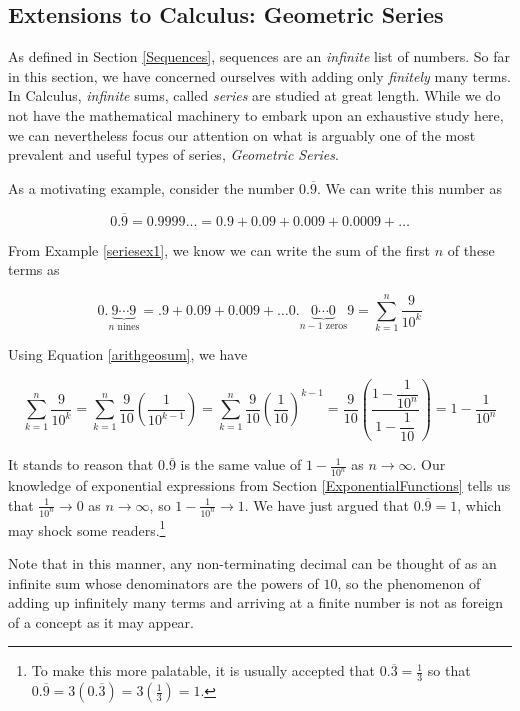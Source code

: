 \subsection{Extensions to Calculus: Geometric Series}

As defined in Section \ref{Sequences}, sequences are an \textit{infinite} list of numbers.  So far in this section, we have concerned ourselves with adding only \textit{finitely} many terms.   In Calculus,  \textit{infinite} sums, called \textit{series} are studied at great length.  While we do not have the mathematical machinery to embark upon an exhaustive study here, we can nevertheless focus our attention on what is arguably one of the most prevalent and useful types of series, \textit{Geometric Series}.

As a motivating example, consider the number $0.\overline{9}$.  We can write this number as

\[ 0.\overline{9} = 0.9999... = 0.9 + 0.09 + 0.009 + 0.0009 + \ldots \]


From Example \ref{seriesex1}, we know we can write the sum of the first $n$ of these terms as 

\[ 0.\underbrace{9 \cdots 9}_{\text{$n$ nines}} = .9 + 0.09 + 0.009 + \ldots 0.\! \! \! \! \underbrace{0 \cdots 0}_{\text{$n-1$ zeros}} \! \! \! \! 9 = \displaystyle{\sum_{k=1}^{n} \dfrac{9}{10^{k}}} \]

Using Equation \ref{arithgeosum}, we have


\[\displaystyle{\sum_{k=1}^{n} \dfrac{9}{10^{k}}} = \sum_{k=1}^{n} \dfrac{9}{10} \left(\dfrac{1}{10^{k-1}}\right) = \sum_{k=1}^{n} \dfrac{9}{10} \left(\dfrac{1}{10}\right)^{k-1} =  \dfrac{9}{10} \left( \dfrac{1 - \dfrac{1}{10^{n}}}{1 - \dfrac{1}{10}} \right) = 1 - \dfrac{1}{10^{n}}   \]

It stands to reason that $0.\overline{9}$ is the same value of $1 - \frac{1}{10^{n}}$ as $n \rightarrow \infty$. Our knowledge of exponential expressions from Section \ref{ExponentialFunctions} tells us that $\frac{1}{10^{n}} \rightarrow 0$ as $n \rightarrow \infty$, so $1 - \frac{1}{10^{n}} \rightarrow 1$.  We have just argued that $0.\overline{9} = 1$, which may shock some readers.\footnote{To make this more palatable, it is usually accepted that $0.\overline{3} = \frac{1}{3}$ so that $0.\overline{9} = 3\left(0.\overline{3}\right) = 3\left(\frac{1}{3} \right) = 1$.}  

Note that in this manner, any non-terminating decimal can be thought of as an infinite sum whose denominators are the powers of $10$, so the phenomenon of adding up infinitely many terms and arriving at a finite number is not as foreign of a concept as it may appear.  

